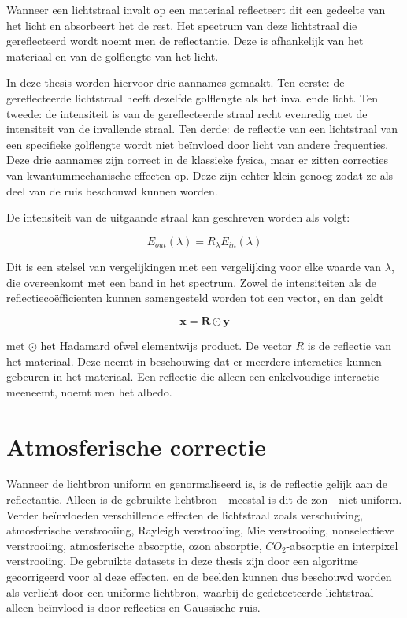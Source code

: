 \documentclass[12pt]{report}
\begin{document}
Wanneer een lichtstraal invalt op een materiaal reflecteert dit een gedeelte van het licht en absorbeert het de rest. Het spectrum van deze lichtstraal die gereflecteerd wordt noemt men de reflectantie. Deze is afhankelijk van het materiaal en van de golflengte van het licht. 

In deze thesis worden hiervoor drie aannames gemaakt. Ten eerste: de gereflecteerde lichtstraal heeft dezelfde golflengte als het invallende licht. Ten tweede: de intensiteit is van de gereflecteerde straal recht evenredig met de intensiteit van de invallende straal. Ten derde: de reflectie van een lichtstraal van een specifieke golflengte wordt niet be\"invloed door licht van andere frequenties. Deze drie aannames zijn correct in de klassieke fysica, maar er zitten correcties van kwantummechanische effecten op. Deze zijn echter klein genoeg zodat ze als deel van de ruis beschouwd kunnen worden.

De intensiteit van de uitgaande straal kan geschreven worden als volgt:

\begin{equation}
E_{out}(\lambda) = R_\lambda E_{in}(\lambda)
\end{equation}

Dit is een stelsel van vergelijkingen met een vergelijking voor elke waarde van $\lambda$, die overeenkomt met een band in het spectrum. Zowel de intensiteiten als de reflectieco\"efficienten kunnen samengesteld worden tot een vector, en dan geldt

\begin{equation}
\bm{x} = \bm{R}\odot \bm{y}
\end{equation}

met $\odot$ het Hadamard ofwel elementwijs product. De vector $R$ is de reflectie van het materiaal. Deze neemt in beschouwing dat er meerdere interacties kunnen gebeuren in het materiaal. Een reflectie die alleen een enkelvoudige interactie meeneemt, noemt men het albedo.


\section{Atmosferische correctie}

Wanneer de lichtbron uniform en genormaliseerd is, is de reflectie gelijk aan de reflectantie. Alleen is de gebruikte lichtbron - meestal is dit de zon - niet uniform. Verder be\"invloeden verschillende effecten de lichtstraal\cite{fun} zoals verschuiving, atmosferische verstrooiing, Rayleigh verstrooiing, Mie verstrooiing, nonselectieve verstrooiing, atmosferische absorptie, ozon absorptie, $CO_2$-absorptie en interpixel verstrooiing. De gebruikte datasets in deze thesis zijn door een algoritme gecorrigeerd voor al deze effecten, en de beelden kunnen dus beschouwd worden als verlicht door een uniforme lichtbron, waarbij de gedetecteerde lichtstraal alleen be\"invloed is door reflecties en Gaussische ruis. 
\end{document}
